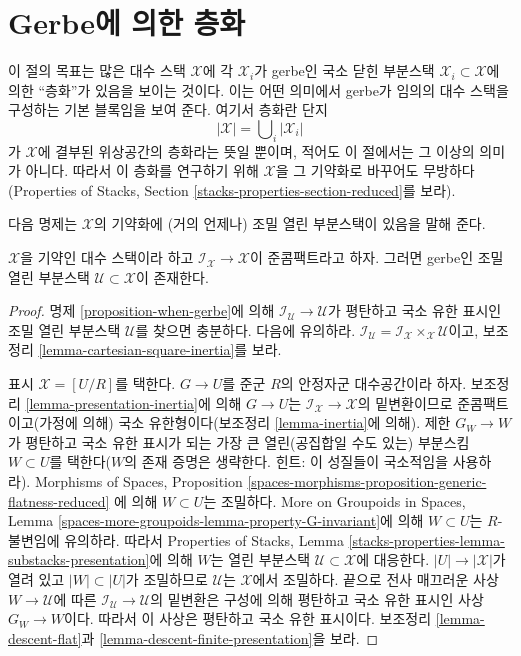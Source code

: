 \section{Gerbe에 의한 층화}
\label{section-stratify}

\noindent
이 절의 목표는 많은 대수 스택 $\mathcal{X}$에 각 $\mathcal{X}_i$가
gerbe인 국소 닫힌 부분스택 $\mathcal{X}_i \subset \mathcal{X}$에 의한
``층화''가 있음을 보이는 것이다. 이는 어떤 의미에서 gerbe가 임의의
대수 스택을 구성하는 기본 블록임을 보여 준다. 여기서 층화란 단지
$$
|\mathcal{X}| = \bigcup\nolimits_i |\mathcal{X}_i|
$$
가 $\mathcal{X}$에 결부된 위상공간의 층화라는 뜻일 뿐이며, 적어도 이
절에서는 그 이상의 의미가 아니다. 따라서 이 층화를 연구하기 위해
$\mathcal{X}$을 그 기약화로 바꾸어도 무방하다(Properties of Stacks,
Section \ref{stacks-properties-section-reduced}를 보라).

\medskip\noindent
다음 명제는 $\mathcal{X}$의 기약화에 (거의 언제나) 조밀 열린 부분스택이
있음을 말해 준다.

\begin{proposition}
\label{proposition-open-stratum}
$\mathcal{X}$을 기약인 대수 스택이라 하고
$\mathcal{I}_\mathcal{X} \to \mathcal{X}$이 준콤팩트라고 하자. 그러면
gerbe인 조밀 열린 부분스택 $\mathcal{U} \subset \mathcal{X}$이 존재한다.
\end{proposition}

\begin{proof}
명제 \ref{proposition-when-gerbe}에 의해
$\mathcal{I}_\mathcal{U} \to \mathcal{U}$가 평탄하고 국소 유한 표시인
조밀 열린 부분스택 $\mathcal{U}$를 찾으면 충분하다. 다음에 유의하라.
$\mathcal{I}_\mathcal{U} =
\mathcal{I}_\mathcal{X} \times_\mathcal{X} \mathcal{U}$이고, 보조정리
\ref{lemma-cartesian-square-inertia}를 보라.

\medskip\noindent
표시 $\mathcal{X} = [U/R]$를 택한다. $G \to U$를 준군 $R$의 안정자군
대수공간이라 하자. 보조정리 \ref{lemma-presentation-inertia}에 의해
$G \to U$는 $\mathcal{I}_\mathcal{X} \to \mathcal{X}$의 밑변환이므로
준콤팩트이고(가정에 의해) 국소 유한형이다(보조정리
\ref{lemma-inertia}에 의해). 제한 $G_W \to W$가 평탄하고 국소 유한
표시가 되는 가장 큰 열린(공집합일 수도 있는) 부분스킴
$W \subset U$를 택한다($W$의 존재 증명은 생략한다. 힌트: 이 성질들이
국소적임을 사용하라). Morphisms of Spaces, Proposition
\ref{spaces-morphisms-proposition-generic-flatness-reduced}
에 의해 $W \subset U$는 조밀하다. More on Groupoids in Spaces, Lemma
\ref{spaces-more-groupoids-lemma-property-G-invariant}에 의해
$W \subset U$는 $R$-불변임에 유의하라. 따라서 Properties of Stacks,
Lemma \ref{stacks-properties-lemma-substacks-presentation}에 의해 $W$는
열린 부분스택 $\mathcal{U} \subset \mathcal{X}$에 대응한다.
$|U| \to |\mathcal{X}|$가 열려 있고 $|W| \subset |U|$가 조밀하므로
$\mathcal{U}$는 $\mathcal{X}$에서 조밀하다. 끝으로 전사 매끄러운 사상
$W \to \mathcal{U}$에 따른 $\mathcal{I}_\mathcal{U} \to \mathcal{U}$의
밑변환은 구성에 의해 평탄하고 국소 유한 표시인 사상 $G_W \to W$이다.
따라서 이 사상은 평탄하고 국소 유한
표시이다. 보조정리 \ref{lemma-descent-flat}과
\ref{lemma-descent-finite-presentation}을 보라.
\end{proof}


